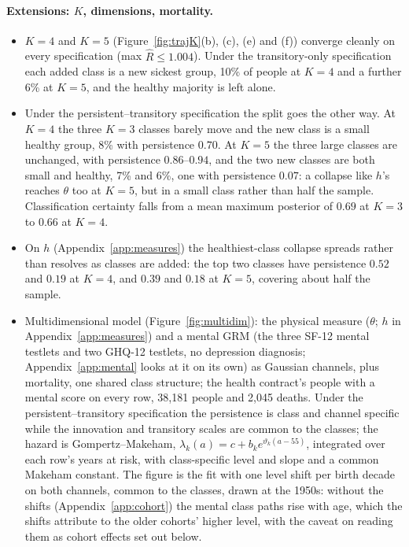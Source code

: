 \documentclass[11pt]{article}
\begin{document}
	\paragraph{Extensions: $K$, dimensions, mortality.}
	\begin{itemize}
		\item $K=4$ and $K=5$ (Figure~\ref{fig:trajK}(b), (c), (e) and (f)) converge cleanly on every specification (max $\hat R\le1.004$). Under the transitory-only specification each added class is a new sickest group, 10\% of people at $K=4$ and a further 6\% at $K=5$, and the healthy majority is left alone.
		\item Under the persistent--transitory specification the split goes the other way. At $K=4$ the three $K=3$ classes barely move and the new class is a small healthy group, 8\% with persistence $0.70$. At $K=5$ the three large classes are unchanged, with persistence $0.86$--$0.94$, and the two new classes are both small and healthy, 7\% and 6\%, one with persistence $0.07$: a collapse like $h$'s reaches $\theta$ too at $K=5$, but in a small class rather than half the sample. Classification certainty falls from a mean maximum posterior of $0.69$ at $K=3$ to $0.66$ at $K=4$.
		\item On $h$ (Appendix~\ref{app:measures}) the healthiest-class collapse spreads rather than resolves as classes are added: the top two classes have persistence $0.52$ and $0.19$ at $K=4$, and $0.39$ and $0.18$ at $K=5$, covering about half the sample.
		\item Multidimensional model (Figure~\ref{fig:multidim}): the physical measure ($\theta$; $h$ in Appendix~\ref{app:measures}) and a mental GRM (the three SF-12 mental testlets and two GHQ-12 testlets, no depression diagnosis; Appendix~\ref{app:mental} looks at it on its own) as Gaussian channels, plus mortality, one shared class structure; the health contract's people with a mental score on every row, 38,181 people and 2,045 deaths. Under the persistent--transitory specification the persistence is class and channel specific while the innovation and transitory scales are common to the classes; the hazard is Gompertz--Makeham, $\lambda_k(a)=c+b_k e^{\vartheta_k(a-55)}$, integrated over each row's years at risk, with class-specific level and slope and a common Makeham constant. The figure is the fit with one level shift per birth decade on both channels, common to the classes, drawn at the 1950s: without the shifts (Appendix~\ref{app:cohort}) the mental class paths rise with age, which the shifts attribute to the older cohorts' higher level, with the caveat on reading them as cohort effects set out below.

\end{itemize}
\end{document}
